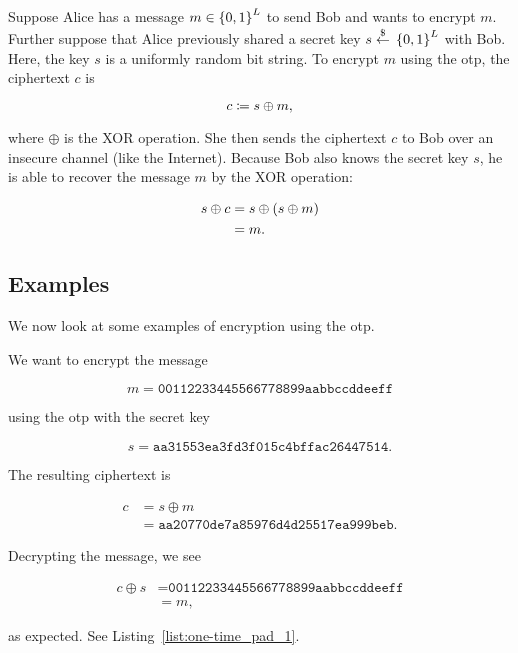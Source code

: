 Suppose Alice has a message $m\in\left\{ 0,1 \right\}^{L}$ to send Bob
and wants to encrypt $m$.
Further suppose that Alice previously shared a secret key
$s\stackrel{\$}{\leftarrow}{}\left\{ 0,1 \right\}^{L}$ with Bob.
Here, the key $s$ is a uniformly random bit string.
To encrypt $m$ using the \gls{otp}, the ciphertext $c$ is

\begin{equation}
    c \coloneqq{} s \oplus m,
\end{equation}

\noindent
where $\oplus$ is the XOR operation.
She then sends the ciphertext $c$ to Bob over an \gls{insecure channel}
(like the Internet).
Because Bob also knows the secret key $s$,
he is able to recover the message $m$ by the XOR operation:

\begin{align}
    s \oplus c &= s \oplus \left( s \oplus m \right) \nonumber\\
        &= m.
\end{align}

\subsection{Examples}

We now look at some examples of encryption using the \gls{otp}.

\begin{example}

We want to encrypt the message

\begin{equation}
    m = \texttt{00112233445566778899aabbccddeeff}
\end{equation}

\noindent
using the \gls{otp} with the secret key

\begin{equation}
    s = \texttt{aa31553ea3fd3f015c4bffac26447514}.
\end{equation}

\noindent
The resulting ciphertext is

\begin{align}
    c &= s \oplus m \nonumber\\
        &= \texttt{aa20770de7a85976d4d25517ea999beb}.
\end{align}

\noindent
Decrypting the message, we see

\begin{align}
    c \oplus s &= \texttt{00112233445566778899aabbccddeeff} \nonumber\\
        &= m,
\end{align}

\noindent
as expected.
See Listing~\ref{list:one-time_pad_1}.


\end{example}

